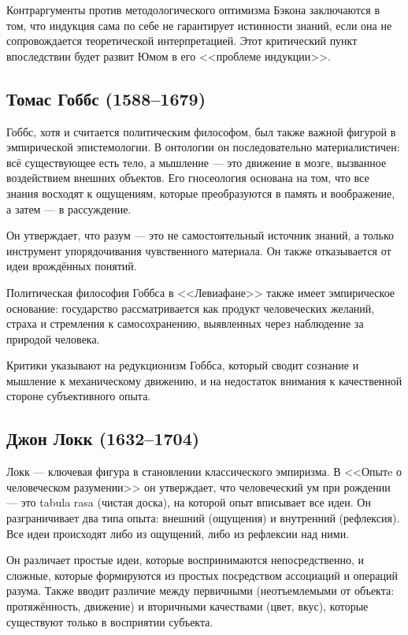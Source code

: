 \documentclass[12pt,a4paper]{article}
\begin{document}
	Контраргументы против методологического оптимизма Бэкона заключаются в том, что индукция сама по себе не гарантирует истинности знаний, если она не сопровождается теоретической интерпретацией. Этот критический пункт впоследствии будет развит Юмом в его <<проблеме индукции>>.
	
	\subsection{Томас Гоббс (1588–1679)}
	Гоббс, хотя и считается политическим философом, был также важной фигурой в эмпирической эпистемологии. В онтологии он последовательно материалистичен: всё существующее есть тело, а мышление — это движение в мозге, вызванное воздействием внешних объектов. Его гносеология основана на том, что все знания восходят к ощущениям, которые преобразуются в память и воображение, а затем — в рассуждение.
	
	Он утверждает, что разум — это не самостоятельный источник знаний, а только инструмент упорядочивания чувственного материала. Он также отказывается от идеи врождённых понятий.
	
	Политическая философия Гоббса в <<Левиафане>> также имеет эмпирическое основание: государство рассматривается как продукт человеческих желаний, страха и стремления к самосохранению, выявленных через наблюдение за природой человека.
	
	Критики указывают на редукционизм Гоббса, который сводит сознание и мышление к механическому движению, и на недостаток внимания к качественной стороне субъективного опыта.
	
	\subsection{Джон Локк (1632–1704)}
	
	Локк — ключевая фигура в становлении классического эмпиризма. В <<Опытe о человеческом разумении>> он утверждает, что человеческий ум при рождении — это tabula rasa (чистая доска), на которой опыт вписывает все идеи. Он разграничивает два типа опыта: внешний (ощущения) и внутренний (рефлексия). Все идеи происходят либо из ощущений, либо из рефлексии над ними.
	
	Он различает простые идеи, которые воспринимаются непосредственно, и сложные, которые формируются из простых посредством ассоциаций и операций разума. Также вводит различие между первичными (неотъемлемыми от объекта: протяжённость, движение) и вторичными качествами (цвет, вкус), которые существуют только в восприятии субъекта.
	
\end{document}
